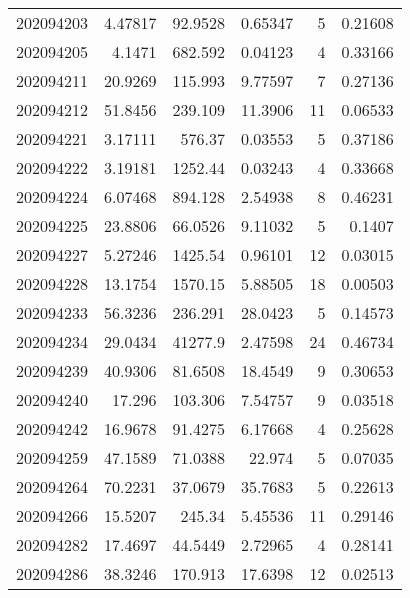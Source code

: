 \begin{tabular}{rrrrrr}
 202094203 &          4.47817 &       92.9528 &            0.65347 &           5 & 0.21608 \\
 202094205 &          4.1471  &      682.592  &            0.04123 &           4 & 0.33166 \\
 202094211 &         20.9269  &      115.993  &            9.77597 &           7 & 0.27136 \\
 202094212 &         51.8456  &      239.109  &           11.3906  &          11 & 0.06533 \\
 202094221 &          3.17111 &      576.37   &            0.03553 &           5 & 0.37186 \\
 202094222 &          3.19181 &     1252.44   &            0.03243 &           4 & 0.33668 \\
 202094224 &          6.07468 &      894.128  &            2.54938 &           8 & 0.46231 \\
 202094225 &         23.8806  &       66.0526 &            9.11032 &           5 & 0.1407  \\
 202094227 &          5.27246 &     1425.54   &            0.96101 &          12 & 0.03015 \\
 202094228 &         13.1754  &     1570.15   &            5.88505 &          18 & 0.00503 \\
 202094233 &         56.3236  &      236.291  &           28.0423  &           5 & 0.14573 \\
 202094234 &         29.0434  &    41277.9    &            2.47598 &          24 & 0.46734 \\
 202094239 &         40.9306  &       81.6508 &           18.4549  &           9 & 0.30653 \\
 202094240 &         17.296   &      103.306  &            7.54757 &           9 & 0.03518 \\
 202094242 &         16.9678  &       91.4275 &            6.17668 &           4 & 0.25628 \\
 202094259 &         47.1589  &       71.0388 &           22.974   &           5 & 0.07035 \\
 202094264 &         70.2231  &       37.0679 &           35.7683  &           5 & 0.22613 \\
 202094266 &         15.5207  &      245.34   &            5.45536 &          11 & 0.29146 \\
 202094282 &         17.4697  &       44.5449 &            2.72965 &           4 & 0.28141 \\
 202094286 &         38.3246  &      170.913  &           17.6398  &          12 & 0.02513 \\

\end{tabular}
